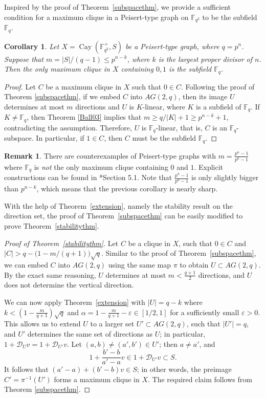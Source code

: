\documentclass[12pt,reqno]{amsart}
\newtheorem{cor}[thm]{Corollary}
\theoremstyle{definition}
\newtheorem{rem}[thm]{Remark}
\newcommand{\F}{\mathbb{F}}
\begin{document}
Inspired by the proof of Theorem~\ref{subspacethm}, we provide a sufficient condition for a maximum clique in a Peisert-type graph on $\F_{q^2}$ to be the subfield $\F_q$. 

\begin{cor} \label{cor:improvement}
Let $X=\operatorname{Cay}(\F_{q^2}^+, S)$ be a Peisert-type graph, where $q=p^n$. Suppose that 
$m=|S|/(q-1)\leq p^{n-k}$, where $k$ is the largest proper divisor of $n$. Then the only maximum clique in $X$ containing $0,1$ is the subfield $\F_q$. 
\end{cor}


\begin{proof}
Let $C$ be a maximum clique in $X$ such that $0\in C$. Following the proof of Theorem \ref{subspacethm}, if we embed $C$ into $AG(2,q)$, then its image $U$ determines at most $m$ directions and $U$ is $K$-linear, where $K$ is a subfield of $\F_q$. If $K \neq \F_q$, then Theorem \ref{Ball03} implies that $m \geq q/|K|+1 \geq p^{n-k}+1$, contradicting the assumption. Therefore, $U$ is $\F_q$-linear, that is, $C$ is an $\F_q$-subspace. In particular, if $1 \in C$, then $C$ must be the subfield $\F_q$.
\end{proof}

\begin{rem}
There are counterexamples of Peisert-type graphs with $m=\frac{p^n-1}{p^k-1}$ where $\F_q$ is \emph{not} the only maximum clique containing $0$ and $1$. Explicit constructions can be found in \cite{AGLY22}*{Section 5.1}. Note that $\frac{p^n-1}{p^k-1}$ is only slightly bigger than $p^{n-k}$, which means that the previous corollary is nearly sharp. 
\end{rem}

With the help of Theorem~\ref{extension}, namely the stability result on the direction set, the proof of Theorem~\ref{subspacethm} can be easily modified to prove Theorem~\ref{stabilitythm}.

\begin{proof}[Proof of Theorem~\ref{stabilitythm}]
Let $C$ be a clique in $X$, such that $0 \in C$ and $|C|>q-\big(1-m/(q+1)\big)\sqrt{q}$. Similar to the proof of Theorem~\ref{subspacethm}, we can embed $C$ into $AG(2,q)$ using the same map $\pi$ to obtain $U \subset AG(2,q)$. By the exact same reasoning, $U$ determines at most $m<\frac{q+1}{2}$ directions, and $U$ does not determine the vertical direction. 

We can now apply Theorem~\ref{extension} with $|U|=q-k$ where $k<\left(1-\frac{m}{q+1}\right)\sqrt{q}$ and $\alpha=1-\frac{m}{q+1}-\varepsilon\in [1/2, 1]$ for a sufficiently small $\varepsilon>0$. This allows us to extend $U$ to a larger set $U' \subset AG(2,q)$, such that $|U'|=q$, and $U'$ determines the same set of directions as $U$; in particular, $1+\mathcal{D}_{U}v=1+\mathcal{D}_{U'}v$. Let $(a,b)\neq (a',b') \in U'$; then $a \neq a'$, and 
\[
1+\frac{b'-b}{a'-a} v \in 1+\mathcal{D}_{U'}v \subset S.
\]
It follows that $(a'-a)+(b'-b)v \in S$; in other words, the preimage $C'=\pi^{-1}(U')$ forms a maximum clique in $X$. The required claim follows from Theorem \ref{subspacethm}.
\end{proof}
\end{document}
